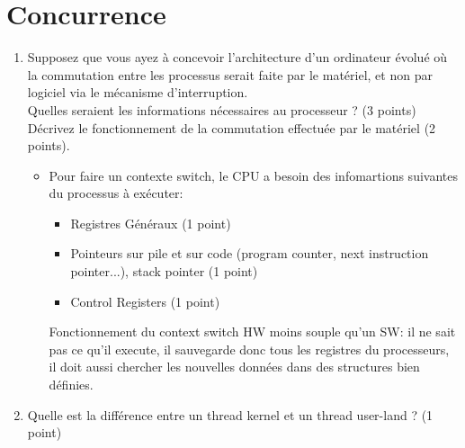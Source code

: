 \section{{Concurrence}
         {\hfill{} }}

\begin{enumerate}

\item Supposez que vous ayez à concevoir l'architecture d'un ordinateur évolué où la commutation entre les processus serait faite par le matériel, et non par logiciel via le mécanisme d'interruption. \\
      Quelles seraient les informations nécessaires au processeur ?  (3 points) \\
      Décrivez le fonctionnement de la commutation effectuée par le matériel (2 points).

\begin{correction}
\begin{itemize}
  \item Pour faire un contexte switch, le CPU a besoin des infomartions suivantes du processus à exécuter:
  \begin{itemize}
    \item Registres Généraux (1 point)
    \item Pointeurs sur pile et sur code (program counter, next instruction pointer...), stack pointer (1 point)
    \item Control Registers (1 point)
  \end{itemize}
  Fonctionnement du context switch HW moins souple qu'un SW: il ne sait pas ce qu'il execute, il sauvegarde donc tous les registres du processeurs, il doit aussi chercher les nouvelles données dans des structures bien définies.
\end{itemize}
\end{correction}


\item Quelle est la différence entre un thread kernel et un thread user-land ? (1 point)

\end{enumerate}


